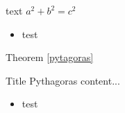 \documentclass{beamer}
\begin{document}
\begin{frame}
    \begin{theorem}[Pythagoras]
            text
        $a^2+b^2=c^2$ 
        \begin{itemize}
        \item test
        \end{itemize}
        \label{pytagoras}
    \end{theorem}

    Theorem \ref{pytagoras}

    \begin{block}{Title Pythagoras}
        content...
        \begin{itemize}
        \item test
        \end{itemize}
    \end{block}
\end{frame} 
\end{document}
